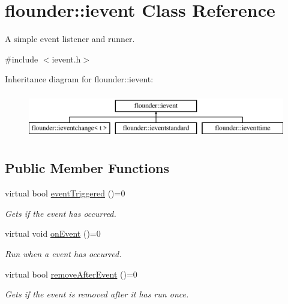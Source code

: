\hypertarget{classflounder_1_1ievent}{}\section{flounder\+:\+:ievent Class Reference}
\label{classflounder_1_1ievent}


A simple event listener and runner.  




{\ttfamily \#include $<$ievent.\+h$>$}

Inheritance diagram for flounder\+:\+:ievent\+:\begin{figure}[H]
\begin{center}
\leavevmode
\includegraphics[height=2.000000cm]{classflounder_1_1ievent}
\end{center}
\end{figure}
\subsection*{Public Member Functions}
\begin{DoxyCompactItemize}
\item 
virtual bool \hyperlink{classflounder_1_1ievent_a4462f66feef99ef4e3521c00f4edd0c9}{event\+Triggered} ()=0
\begin{DoxyCompactList}\small\item\em Gets if the event has occurred. \end{DoxyCompactList}\item 
virtual void \hyperlink{classflounder_1_1ievent_a6c6abe67435870b25eccd57a251a8992}{on\+Event} ()=0
\begin{DoxyCompactList}\small\item\em Run when a event has occurred. \end{DoxyCompactList}\item 
virtual bool \hyperlink{classflounder_1_1ievent_a7017c8803df2397758980cb61020e801}{remove\+After\+Event} ()=0
\begin{DoxyCompactList}\small\item\em Gets if the event is removed after it has run once. \end{DoxyCompactList}\end{DoxyCompactItemize}


